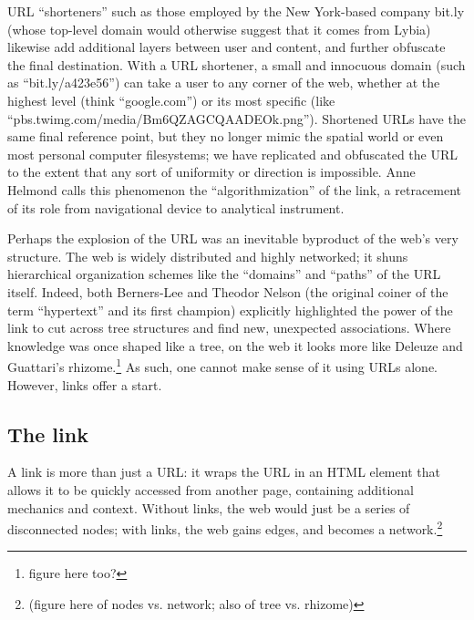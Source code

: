 URL ``shorteners'' such as those employed by the New York-based company bit.ly (whose top-level domain would otherwise suggest that it comes from Lybia) likewise add additional layers between user and content, and further obfuscate the final destination. With a URL shortener, a small and innocuous domain (such as ``bit.ly/a423e56'') can take a user to any corner of the web, whether at the highest level (think ``google.com'') or its most specific (like ``pbs.twimg.com/media/Bm6QZAGCQAADEOk.png''). Shortened URLs have the same final reference point, but they no longer mimic the spatial world or even most personal computer filesystems; we have replicated and obfuscated the URL to the extent that any sort of uniformity or direction is impossible. Anne Helmond calls this phenomenon the ``algorithmization'' of the link, a retracement of its role from navigational device to analytical instrument.\autocite{helmond_algorithmization_2013}

Perhaps the explosion of the URL was an inevitable byproduct of the web's very structure. The web is widely distributed and highly networked; it shuns hierarchical organization schemes like the ``domains'' and ``paths'' of the URL itself. Indeed, both Berners-Lee and Theodor Nelson (the original coiner of the term ``hypertext'' and its first champion) explicitly highlighted the power of the link to cut across tree structures and find new, unexpected associations.\autocite[104]{zimmer_renvois_2009} Where knowledge was once shaped like a tree, on the web it looks more like Deleuze and Guattari's rhizome.\autocite{deleuze_thousand_1987}\footnote{figure here too?} As such, one cannot make sense of it using URLs alone. However, links offer a start.

\subsection{The link}

A link is more than just a URL: it wraps the URL in an HTML element that allows it to be quickly accessed from another page, containing additional mechanics and context. Without links, the web would just be a series of disconnected nodes; with links, the web gains edges, and becomes a network.\footnote{(figure here of nodes vs. network; also of tree vs. rhizome)} 


